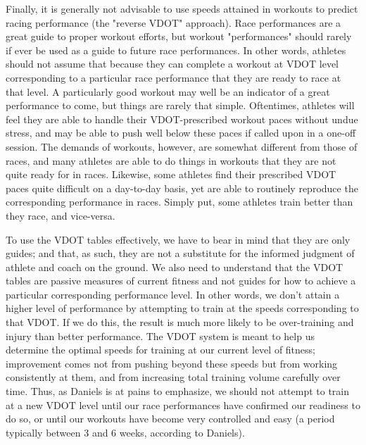 Finally, it is generally not advisable to use speeds attained in workouts to predict racing performance (the "reverse VDOT" approach). Race performances are a great guide to proper workout efforts, but workout "performances" should rarely if ever be used as a guide to future race performances. In other words, athletes should not assume that because they can complete a workout at VDOT level corresponding to a particular race performance that they are ready to race at that level. A particularly good workout may well be an indicator of a great performance to come, but things are rarely that simple. Oftentimes, athletes will feel they are able to handle their VDOT-prescribed workout paces without undue stress, and may be able to push well below these paces if called upon in a one-off session. The demands of workouts, however, are somewhat different from those of races, and many athletes are able to do things in workouts that they are not quite ready for in races. Likewise, some athletes find their prescribed VDOT paces quite difficult on a day-to-day basis, yet are able to routinely reproduce the corresponding performance in races. Simply put, some athletes train better than they race, and vice-versa.

To use the VDOT tables effectively, we have to bear in mind that they are only guides; and that, as such, they are not a substitute for the informed judgment of athlete and coach on the ground. We also need to understand that the VDOT tables are passive measures of current fitness and not guides for how to achieve a particular corresponding performance level. In other words, we don't attain a higher level of performance by attempting to train at the speeds corresponding to that VDOT. If we do this, the result is much more likely to be over-training and injury than better performance. The VDOT system is meant to help us determine the optimal speeds for training at our current level of fitness; improvement comes not from pushing beyond these speeds but from working consistently at them, and from increasing total training volume carefully over time. Thus, as Daniels is at pains to emphasize, we should not attempt to train at a new VDOT level until our race performances have confirmed our readiness to do so, or until our workouts have become very controlled and easy (a period typically between 3 and 6 weeks, according to Daniels).


